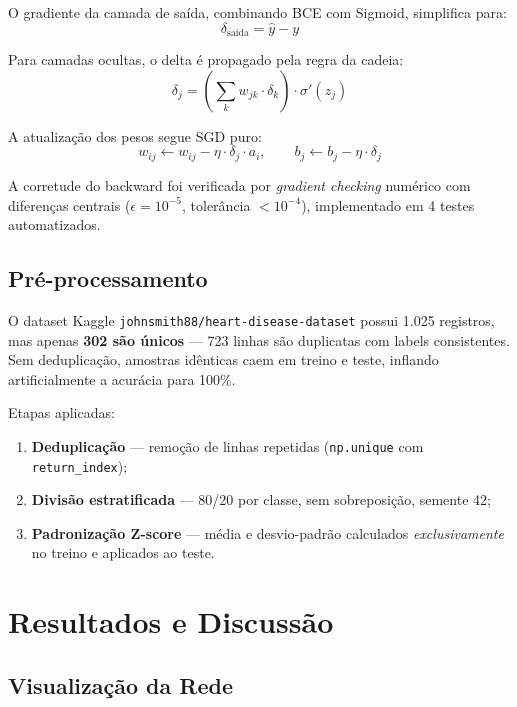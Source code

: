 \documentclass[runningheads]{llncs}
\begin{document}
O gradiente da camada de saída, combinando BCE com Sigmoid, simplifica
para:
\[
\delta_{\text{saída}} = \hat{y} - y
\]

Para camadas ocultas, o delta é propagado pela regra da cadeia:
\[
\delta_j = \left(\sum_k w_{jk} \cdot \delta_k\right) \cdot
\sigma'(z_j)
\]

A atualização dos pesos segue SGD puro:
\[
w_{ij} \leftarrow w_{ij} - \eta \cdot \delta_j \cdot a_i, \qquad
b_j \leftarrow b_j - \eta \cdot \delta_j
\]

A corretude do backward foi verificada por \textit{gradient checking}
numérico com diferenças centrais ($\epsilon = 10^{-5}$, tolerância
$< 10^{-4}$), implementado em 4 testes automatizados.

\subsection{Pré-processamento}

O dataset Kaggle \texttt{johnsmith88/heart-disease-dataset} possui
1.025 registros, mas apenas \textbf{302 são únicos} — 723 linhas
são duplicatas com labels consistentes. Sem deduplicação, amostras
idênticas caem em treino e teste, inflando artificialmente a acurácia
para 100\%.

Etapas aplicadas:
\begin{enumerate}
    \item \textbf{Deduplicação} — remoção de linhas repetidas
          (\texttt{np.unique} com \texttt{return\_index});
    \item \textbf{Divisão estratificada} — 80/20 por classe,
          sem sobreposição, semente 42;
    \item \textbf{Padronização Z-score} — média e desvio-padrão
          calculados \textit{exclusivamente} no treino e aplicados
          ao teste.
\end{enumerate}

\section{Resultados e Discussão}

\subsection{Visualização da Rede}
\end{document}
